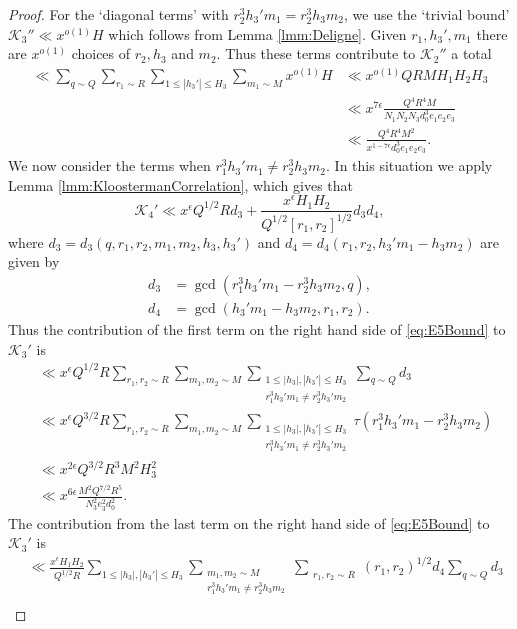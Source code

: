 \documentclass[10pt]{amsart}
\theoremstyle{plain}
\numberwithin{equation}{section}
\begin{document}
\begin{proof}
For the `diagonal terms' with $r_2^3 h_3'm_1= r_2^3 h_3 m_2$, we use the `trivial bound' $\mathscr{K}_3''\ll x^{o(1)}H$ which follows from Lemma \ref{lmm:Deligne}. Given $r_1,h_3',m_1$ there are $x^{o(1)}$ choices of $r_2,h_3$ and $m_2$. Thus these terms contribute to $\mathscr{K}_2''$ a total
\begin{align}
\ll\sum_{q\sim Q}\sum_{r_1\sim R}\sum_{1\le |h_3'|\le H_3}\sum_{m_1\sim M}x^{o(1)} H
&\ll x^{o(1)}Q R M H_1 H_2 H_3\nonumber\\
&\ll x^{7\epsilon}\frac{Q^4 R^4 M}{N_1 N_2 N_3 d_0^3 e_1e_2e_3}\nonumber\\
&\ll \frac{Q^4 R^4 M^2}{x^{1-7\epsilon} d_0^3 e_1e_2e_3}.\label{eq:KBound1}
\end{align}
We now consider the terms when $r_1^3 h_3' m_1\ne r_2^3 h_3 m_2$. In this situation we apply Lemma \ref{lmm:KloostermanCorrelation}, which gives that 
\begin{equation}
\mathscr{K}_4'\ll x^\epsilon Q^{1/2} R d_3+\frac{x^{\epsilon}H_1 H_2 }{Q^{1/2}[r_1,r_2]^{1/2}}d_3 d_4,
\label{eq:E5Bound}
\end{equation}
where $d_3=d_3(q,r_1,r_2,m_1,m_2,h_3,h_3')$ and $d_4=d_4(r_1,r_2,h_3'm_1-h_3m_2)$ are given by
\begin{align*}
d_3&=\gcd(r_1^3 h_3'm_1-r_2^3 h_3 m_2,q),\\
d_4&=\gcd(h_3'm_1-h_3m_2,r_1,r_2).
\end{align*}
Thus the contribution of the first term on the right hand side of \eqref{eq:E5Bound} to $\mathscr{K}_3'$ is
\begin{align}
&\ll x^\epsilon Q^{1/2} R \sum_{r_1,r_2\sim R}\sum_{m_1,m_2\sim M} \sum_{\substack{1\le |h_3|,|h_3'|\le H_3\\ r_1^3 h_3'm_1\ne r_2^3 h_3'm_2}}\sum_{q\sim Q}d_3\nonumber\\
&\ll x^\epsilon Q^{3/2}R \sum_{r_1,r_2\sim R}\sum_{m_1,m_2\sim M} \sum_{\substack{1\le |h_3|,|h_3'|\le H_3\\ r_1^3 h_3'm_1\ne r_2^3 h_3'm_2}}\tau(r_1^3 h_3'm_1-r_2^3 h_3m_2)\nonumber\\
&\ll x^{2\epsilon} Q^{3/2} R^3 M^2 H_3^2\nonumber\\
&\ll x^{6\epsilon} \frac{M^2 Q^{7/2} R^5}{N_3^2 e_3^2 d_0^{2}}.\label{eq:KBound2}
\end{align}
The contribution from the last term on the right hand side of \eqref{eq:E5Bound} to $\mathscr{K}_3'$ is
\begin{align}
&\ll \frac{x^\epsilon H_1H_2}{Q^{1/2} R}\sum_{1\le |h_3|,|h_3'|\le H_3}\sum_{\substack{m_1,m_2\sim M\\ r_1^3 h_3' m_1\ne r_2^3 h_3m_2}}\sum_{\substack{r_1,r_2\sim R}}(r_1,r_2)^{1/2}d_4\sum_{q\sim Q}d_3\nonumber\\

\end{align}
\end{proof}
\end{document}
